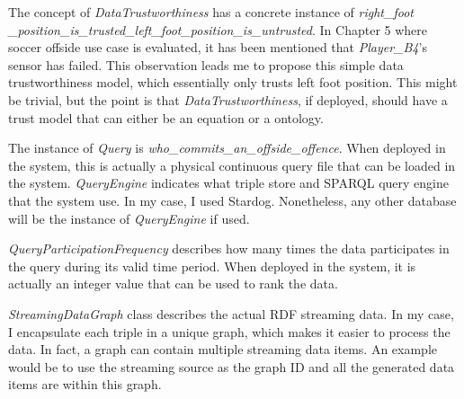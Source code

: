 The concept of \textit{DataTrustworthiness} has a concrete instance of \textit{right\_foot\\\_position\_is\_trusted\_left\_foot\_position\_is\_untrusted}.
In Chapter 5 where soccer offside use case is evaluated, it has been mentioned that \textit{Player\_B4}'s sensor has failed.
This observation leads me to propose this simple data trustworthiness model, which essentially only trusts left foot position. 
This might be trivial, but the point is that \textit{DataTrustworthiness}, if deployed, should have a trust model that can either be an equation or a ontology. 

The instance of \textit{Query} is \textit{who\_commits\_an\_offside\_offence}. 
When deployed in the system, this is actually a physical continuous query file that can be loaded in the system. 
\textit{QueryEngine} indicates what triple store and SPARQL query engine that the system use. 
In my case, I used Stardog. 
Nonetheless, any other database will be the instance of \textit{QueryEngine} if used. 

\textit{QueryParticipationFrequency} describes how many times the data participates in the query during its valid time period.
When deployed in the system, it is actually an integer value that can be used to rank the data. 

\textit{StreamingDataGraph} class describes the actual RDF streaming data.
In my case, I encapsulate each triple in a unique graph, which makes it easier to process the data.
In fact, a graph can contain multiple streaming data items. 
An example would be to use the streaming source as the graph ID and all the generated data items are within this graph. 

